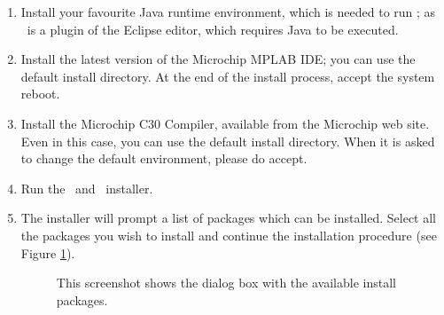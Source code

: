 \begin{enumerate}

\item Install your favourite Java runtime environment, which is needed
  to run \rtd; as \rtd\ is a plugin of the Eclipse editor, which
  requires Java to be executed.

\item Install the latest version of the Microchip MPLAB IDE; you can
  use the default install directory. At the end of the install
  process, accept the system reboot.
  
\item Install the Microchip C30 Compiler, available from the Microchip
  web site.  Even in this case, you can use the default install
  directory. When it is asked to change the default environment,
  please do accept.

\item Run the \ee\ and \rtd\ installer.

\item The installer will prompt a list of packages which can be
  installed. Select all the packages you wish to install and
  continue the installation procedure (see Figure \ref{fig:installer-options}).
%
\begin{figure}[htb]
\caption{This screenshot shows the dialog box with the available install packages.}
\label{fig:installer-options}
\end{figure}



\end{enumerate}
